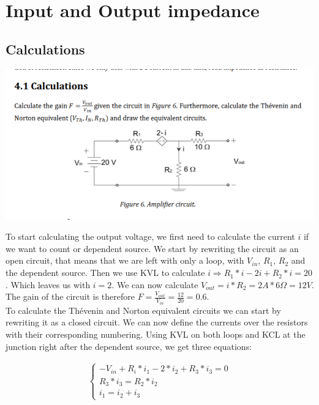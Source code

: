\documentclass[11pt]{article}
\begin{document}
\section{\bf{Input and Output impedance}}

\subsection[25pt]{\bf{Calculations}}

\includegraphics[width=\linewidth]{4.1 calculations.png}


\noindent
To start calculating the output voltage, we first need to calculate the current $i$ if we want to count or dependent source.
We start by rewriting the circuit as an open circuit, that means that we are left with only a loop, with $V_{in}$, $R_{1}$, $R_{2}$ and the dependent source.
Then we use KVL to calculate $i \Rightarrow R_{1}*i - 2i + R_{2}*i = 20$.
Which leaves us with $i = 2$.
We can now calculate $V_{out} = i*R_{2} = 2A*6\Omega = 12V$.
The gain of the circuit is therefore $F = \frac{V_{out}}{V_{in}} = \frac{12}{20} = 0.6$.
\noindent
\\

\noindent
To calculate the Thévenin and Norton equivalent circuits we can start by rewriting it as a closed circuit.
We can now define the currents over the resistors with their corresponding numbering.
Using KVL on both loops and KCL at the junction right after the dependent source, we get three equations:

\begin{gather*}
    \begin{cases}
        -V_{in} + R_{i}*i_{1}-2*i_{2} + R_{3}*i_{3} = 0 \\
        R_{3}*i_{3} = R_{2}*i_{2} \\
        i_{1} = i_{2} + i_{3}
    \end{cases}
\end{gather*}
\end{document}
